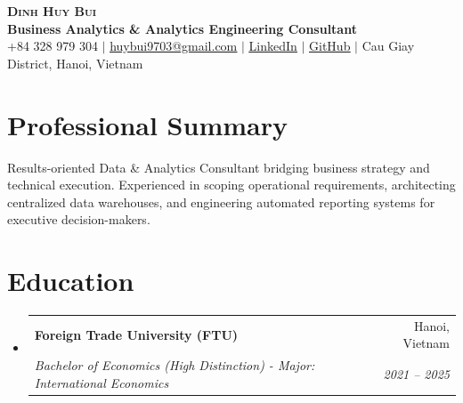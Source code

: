 \documentclass[letterpaper,11pt]{article}
\makeatletter
\newcommand{\resumeSubheading}[4]{
  \vspace{2pt}\item
    \begin{tabular*}{\textwidth}[t]{l@{\extracolsep{\fill}}r}
      \textbf{#1} & #2 \\
      \textit{\small#3} & \textit{\small #4} \\
    \end{tabular*}\vspace{-2pt}
}
\newcommand{\resumeSubHeadingListStart}{\begin{itemize}[leftmargin=0.15in, label={}]}
\newcommand{\resumeSubHeadingListEnd}{\end{itemize}}
\makeatother
\begin{document}
\begin{center}
    \textbf{\Huge \scshape Dinh Huy Bui} \\ \vspace{3pt}
    \small \textbf{\color{NavyBlue} Business Analytics \& Analytics Engineering Consultant} \\ \vspace{4pt}
    \small +84 328 979 304 $|$ \href{mailto:huybui9703@gmail.com}{\underline{huybui9703@gmail.com}} $|$ 
    \href{https://www.linkedin.com/in/dinh-huy-bui/}{\underline{LinkedIn}} $|$
    \href{https://github.com/dewey97}{\underline{GitHub}} $|$
    Cau Giay District, Hanoi, Vietnam
\end{center}

\vspace{2pt}

\section*{Professional Summary}
\small{Results-oriented Data \& Analytics Consultant bridging business strategy and technical execution. Experienced in scoping operational requirements, architecting centralized data warehouses, and engineering automated reporting systems for executive decision-makers.}

\section*{Education}
  \resumeSubHeadingListStart
    \resumeSubheading
      {Foreign Trade University (FTU)}{Hanoi, Vietnam}
      {Bachelor of Economics (High Distinction) - Major: International Economics}{2021 -- 2025}
  \resumeSubHeadingListEnd

\end{document}
